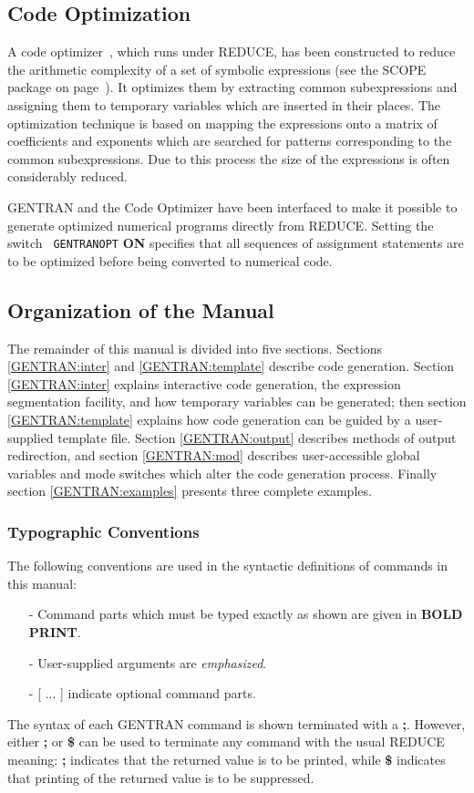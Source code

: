 \subsection{Code Optimization}
A code optimizer~\cite{vanHulzen:89}, which runs under REDUCE, has
been constructed to reduce the arithmetic complexity of a set of
symbolic expressions (see the SCOPE package on
page~\pageref{SCOPE:intro}).  It optimizes them by extracting common
subexpressions and assigning them to temporary variables which are
inserted in their places.  The optimization technique is based on
mapping the expressions onto a matrix of coefficients and exponents
which are searched for patterns corresponding to the common
subexpressions.  Due to this process the size of the expressions is
often considerably reduced.

GENTRAN and the Code Optimizer have been interfaced to make it
possible to generate optimized numerical programs directly
 from REDUCE.  Setting the switch {\tt
GENTRANOPT} {\bf ON} specifies that all sequences of assignment
statements are to be optimized before being converted to numerical
code.

\subsection{Organization of the Manual}
The remainder of this manual is divided into five sections.  Sections
\ref{GENTRAN:inter} and \ref{GENTRAN:template} describe code
generation.  Section \ref{GENTRAN:inter} explains interactive code
generation, the expression segmentation facility, and how temporary
variables can be generated; then section \ref{GENTRAN:template}
explains how code generation can be guided by a user-supplied template
file.  Section \ref{GENTRAN:output} describes methods of output
redirection, and section \ref{GENTRAN:mod} describes user-accessible
global variables and mode switches which alter the code generation
process.  Finally section \ref{GENTRAN:examples} presents three
complete examples.

\subsubsection{Typographic Conventions}
The following conventions are used in the syntactic definitions of
commands in this manual:
\begin{itemize}
\item[{-}]
Command parts which must be typed exactly as shown are given in 
{\bf BOLD PRINT}.
\item[{-}]
User-supplied arguments are {\it emphasized}.
\item[{-}]
[ ... ] indicate optional command parts.
\end{itemize}
The syntax of each GENTRAN command is shown terminated with a {\bf ;}.
However, either {\bf ;} or {\bf \$} can be used to terminate any
command with the usual REDUCE meaning:  {\bf ;} indicates that the
returned value is to be printed, while {\bf \$} indicates that printing
of the returned value is to be suppressed.


